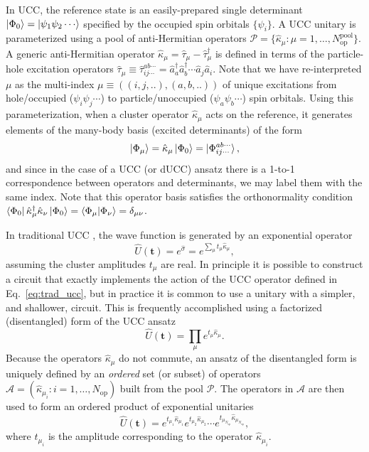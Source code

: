 \documentclass[aps,prx, reprint]{revtex4-2}
\newcommand{\cop}[1]{\hat{a}^{\dagger}_{#1}}
\newcommand{\aop}[1]{\hat{a}_{#1}}
\begin{document}
In UCC, the reference state is an easily-prepared single determinant $\ket{\Phi_0} = \ket{\psi_1 \psi_2 \cdots}$ specified by the occupied spin orbitals $\{ \psi_i \}$.
 A UCC unitary is parameterized using a pool
of anti-Hermitian operators $\mathcal{P} = \{  \hat{\kappa}_\mu : \mu =1 ,\ldots, N_\mathrm{op}^\mathrm{pool} \}$.
A generic anti-Hermitian operator $\hat{\kappa}_\mu = \hat{\tau}_\mu - \hat{\tau}_\mu^\dagger$ is defined in terms of the particle-hole excitation operators
$ \hat{\tau}_\mu \equiv  \hat{\tau}_{ij\cdots}^{ab\cdots} = \cop{a} \cop{b} \cdots \aop{j} \aop{i}$.
Note that we have re-interpreted $\mu$ as the multi-index $\mu \equiv ((i,j,..),(a,b,..))$ of unique excitations from hole/occupied ($\psi_i \psi_j \cdots$) to particle/unoccupied ($\psi_a \psi_b \cdots$) spin orbitals.
Using this parameterization, when a cluster operator $ \hat{\kappa}_\mu$ acts on the reference, it generates elements of the many-body basis (excited determinants) of the form
\begin{equation}
\ket{\Phi_\mu} = \hat{\kappa}_\mu \ket{\Phi_0} = \ket{\Phi_{ij\cdots}^{ab\cdots}},
\end{equation}
and since in the case of a UCC (or dUCC) ansatz there is a 1-to-1 correspondence between operators and determinants, we may label them with the same index.
Note that this operator basis satisfies the orthonormality condition $\bra{\Phi_0} \hat{\kappa}^\dagger_\mu  \hat{\kappa}_\nu \ket{\Phi_0} = \braket{\Phi_\mu|\Phi_\nu} = \delta_{\mu\nu}$.

In traditional UCC \cite{szalay1995alternative, taube2006new, cooper2010benchmark, evangelista2011alternative, harsha2018difference}, the wave function is generated by an exponential operator
\begin{equation}
\label{eq:trad_ucc}
\hat{U}(\mathbf{t}) = e^{\hat{\sigma}} = e^{\sum_\mu t_\mu \hat{\kappa}_\mu},
\end{equation}
assuming the cluster amplitudes $t_\mu$ are real.
In principle it is possible to construct a circuit that exactly implements the action of the UCC operator defined in Eq.~\eqref{eq:trad_ucc}, but in practice it is common to use a unitary with a simpler, and shallower, circuit.
This is frequently accomplished using a factorized (disentangled) form of the UCC ansatz
\begin{equation}
\label{eq:st_ucc}
\hat{U}(\mathbf{t})=
 \prod_\mu e^{ t_\mu \hat{\kappa}_\mu}.
\end{equation}
Because the operators $\hat{\kappa}_\mu$ do not commute, an ansatz of the disentangled form is uniquely defined by an \textit{ordered} set (or subset) of operators $\mathcal{A} = ( \hat{\kappa}_{\mu_i}: i = 1, \ldots, N_\mathrm{op} )$ built from the pool $\mathcal{P}$.
The operators in $\mathcal{A}$ are then used to form an ordered product of exponential unitaries
\begin{equation}
\label{eq:qucc}
\hat{U}(\mathbf{t})
= e^{t_{\mu_1} \hat{\kappa}_{\mu_1}}  e^{t_{\mu_2} \hat{\kappa}_{\mu_2}} \cdots e^{t_{\mu_{N_\mathrm{op}}} \hat{\kappa}_{\mu_{N_\mathrm{op}}}},
\end{equation}
where $t_{\mu_i}$ is the amplitude corresponding to the operator $\hat{\kappa}_{\mu_i}$.
\end{document}
